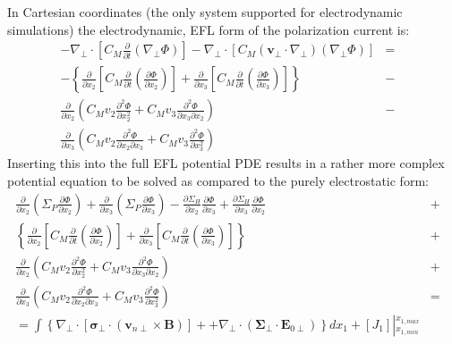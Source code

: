 \documentclass[11pt,letterpaper]{article}
\begin{document}
In Cartesian coordinates (the only system supported for electrodynamic simulations) the electrodynamic, EFL form of the polarization current is:
\begin{eqnarray}
- \nabla_\perp \cdot \left[ C_M \frac{\partial}{\partial t} \left( \nabla_\perp \Phi \right) \right]  - \nabla_\perp \cdot \left[ C_M \left( \mathbf{v}_\perp \cdot \nabla_\perp  \right) \left( \nabla_\perp \Phi \right) \right] &=& \nonumber \\
- \left\{ \frac{\partial}{\partial x_2} \left[ C_M \frac{\partial}{\partial t} \left( \frac{\partial \Phi}{\partial x_2} \right) \right] + \frac{\partial}{\partial x_3} \left[ C_M \frac{\partial}{\partial t} \left( \frac{\partial \Phi}{\partial x_3} \right) \right] \right\} &-& \nonumber \\
\frac{\partial}{\partial x_2} \left( C_M v_2 \frac{\partial^2 \Phi}{\partial x_2^2} + C_M v_3 \frac{\partial^2 \Phi}{\partial x_3 \partial x_2} \right) &-& \nonumber \\
\frac{\partial}{\partial x_3} \left( C_M v_2 \frac{\partial^2 \Phi}{\partial x_2 \partial x_3} + C_M v_3 \frac{\partial^2 \Phi}{\partial x_3^2} \right)
\end{eqnarray}
Inserting this into the full EFL potential PDE results in a rather more complex potential equation to be solved as compared to the purely electrostatic form:
\begin{eqnarray}
\frac{\partial}{\partial x_2} \left( \Sigma_P \frac{\partial \Phi}{\partial x_2} \right) + \frac{\partial}{\partial x_3} \left( \Sigma_P \frac{\partial \Phi}{\partial x_3} \right) -  \frac{\partial \Sigma_H}{\partial x_2} \frac{\partial \Phi}{\partial x_3} + \frac{\partial \Sigma_H}{\partial x_3} \frac{\partial \Phi}{\partial x_2} &+& \nonumber \\ 
\left\{ \frac{\partial}{\partial x_2} \left[ C_M \frac{\partial}{\partial t} \left( \frac{\partial \Phi}{\partial x_2} \right) \right] + \frac{\partial}{\partial x_3} \left[ C_M \frac{\partial}{\partial t} \left( \frac{\partial \Phi}{\partial x_3} \right) \right] \right\} &+& \nonumber \\
\frac{\partial}{\partial x_2} \left( C_M v_2 \frac{\partial^2 \Phi}{\partial x_2^2} + C_M v_3 \frac{\partial^2 \Phi}{\partial x_3 \partial x_2} \right) &+& \nonumber \\
\frac{\partial}{\partial x_3} \left( C_M v_2 \frac{\partial^2 \Phi}{\partial x_2 \partial x_3} + C_M v_3 \frac{\partial^2 \Phi}{\partial x_3^2} \right) &=& \nonumber \\
= \int \left\{ \nabla_\perp \cdot \left[ \boldsymbol{\sigma}_\perp \cdot \left( \mathbf{v}_{n\perp} \times \mathbf{B} \right) \right] + + \nabla_\perp \cdot \left( \boldsymbol{\Sigma}_\perp \cdot \mathbf{E}_{0\perp} \right) \right\} d x_1 + \left[J_1 \right] \left|^{x_{1,max}}_{x_{1,min}} \right. \label{eqn:electrodynamic}
\end{eqnarray}
\end{document}

